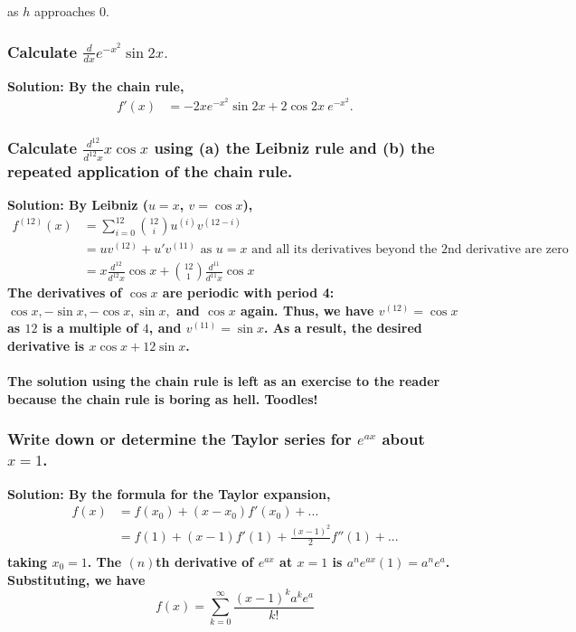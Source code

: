 \documentclass{article}
\begin{document}
as $h$ approaches 0.

\hrulefill
\subsubsection*{Calculate $\frac{d}{dx} e^{-x^2}\sin 2x.$}
\bf{Solution: }\normalfont By the chain rule,
\begin{equation*}
    \begin{aligned}
        f'(x) &= -2x e^{-x^2}\sin 2x + 2\cos 2x \ e^{-x^2}.
    \end{aligned}
\end{equation*}

\hrulefill
\subsubsection*{Calculate $\frac{d^{12}}{d^{12} x} x \cos x$ using (a) the Leibniz rule and (b) the repeated application of the chain rule.}
\bf{Solution: }\normalfont By Leibniz ($u = x$, $v = \cos x$),
\begin{equation*}
    \begin{aligned}
        f^{(12)}(x) &= \sum_{i=0}^{12} {12 \choose i} u^{(i)} v^{(12-i)} \\
        &= uv^{(12)} + u'v^{(11)} \text{ as $u = x$ and all its derivatives beyond the 2nd derivative are zero} \\        
        &= x \frac{d^{12}}{d^{12} x} \cos x + {12 \choose 1}\frac{d^{11}}{d^{11} x}\cos x
    \end{aligned}
\end{equation*}
The derivatives of $\cos x$ are periodic with period 4: $\cos x, -\sin x, -\cos x, \sin x,$ and $ \cos x$ again.
Thus, we have $v^{(12)} = \cos x$ as $12$ is a multiple of $4$, and $v^{(11)} = \sin x$.
As a result, the desired derivative is $x \cos x + 12\sin x$.
\\
\\
The solution using the chain rule is left as an exercise to the reader because the chain rule is boring as hell. Toodles!

\hrulefill
\subsubsection*{Write down or determine the Taylor series for $e^{ax}$ about $x=1$.}
\bf Solution: \normalfont By the formula for the Taylor expansion, 
\begin{equation*}
    \begin{aligned}
        f(x) &= f(x_0) + (x-x_0)f'(x_0) + ... \\
        &= f(1) + (x-1)f'(1) + \frac{(x-1)^2}{2}f''(1) + ...\\
    \end{aligned}
\end{equation*}
taking $x_0 = 1$. The $(n)$th derivative of $e^{ax}$ at $x=1$ is $a^n e^{ax}(1) = a^n e^a$. Substituting, we have
\begin{equation*}
    f(x) = \sum_{k=0}^{\infty} \frac{(x-1)^k a^k e^a}{k!}
\end{equation*}
\end{document}
